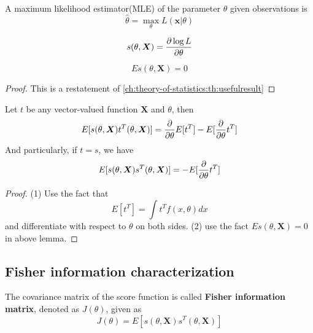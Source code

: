 \begin{refsection}
\begin{definition}
\end{definition}

\begin{definition}
	\cite[316]{casella2002statistical} A maximum likelihood estimator(MLE) of the parameter $\theta$ given observations is
	$$\hat{\theta} = \max_{\theta} L(\bm{x}|\theta)$$
\end{definition}


\begin{definition}\cite[548]{moon2000mathematical}
	
	$$s(\theta,\bm{X}) = \frac{\partial \log L}{\partial \theta}$$
\end{definition}

\begin{lemma}
	$$Es(\theta,\bm{X}) = 0$$
\end{lemma}
\begin{proof}
	This is a restatement of \autoref{ch:theory-of-statistics:th:usefulresult}
\end{proof}

\begin{lemma}\cite[550]{moon2000mathematical}
	Let $t$ be any vector-valued function $\bm{X}$ and $\theta$, then
	$$E[s(\theta,\bm{X})t^T(\theta,\bm{X})] = \frac{\partial}{\partial \theta} E[t^T] - E[\frac{\partial}{\partial \theta} t^T]$$ 
	And particularly, if $t = s$, we have
		$$E[s(\theta,\bm{X})s^T(\theta,\bm{X})] =  - E[\frac{\partial}{\partial \theta} t^T]$$ 	
\end{lemma}
\begin{proof}
(1)	Use the fact that
	$$E[t^T] = \int t^T f(x,\theta) dx$$
	and differentiate with respect to $\theta$ on both sides.
	(2) use the fact $Es(\theta,\bm{X}) = 0$ in above lemma.
\end{proof}

\subsection{Fisher information characterization}
\begin{definition}
The covariance matrix of the score function is called \textbf{Fisher information matrix}, denoted as $J(\theta)$, given as
$$J(\theta) = E[s(\theta,\bm{X})s^T(\theta,\bm{X})]$$
\end{definition}



\end{refsection}
